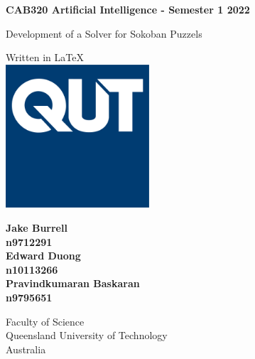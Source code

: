 \documentclass[a4paper,12pt]{article}
\begin{document}
\begin{titlepage}
   \begin{center}
       \vspace*{1cm}
 
       \textbf{CAB320 Artificial Intelligence - Semester 1 2022}
 
       \vspace{0.5cm}
        \LARGE{Development of a Solver for Sokoban Puzzels}
 
       \vspace{1.5cm}

       \vfill
       
       \vspace{0.8cm}
       \normalsize
 	   Written in \LaTeX \\
       \includegraphics[width=0.4\textwidth]{QUT.jpg}

       \large
       \textbf{Jake Burrell}\\
       \textbf{n9712291}\\
       \textbf{Edward Duong}\\
       \textbf{n10113266}\\
       \textbf{Pravindkumaran Baskaran}\\
       \textbf{n9795651}

       \vspace{1.5cm}
 
       \normalsize
       Faculty of Science \\
       Queensland University of Technology\\
       Australia\\ 
   \end{center}
\end{titlepage}

\end{document}
